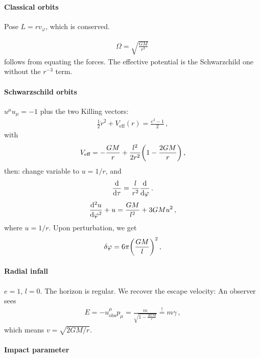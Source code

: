 \documentclass[main.tex]{subfiles}
\begin{document}
\paragraph{Classical orbits}

Pose \(L = r v_{\varphi }\), which is conserved. 

\begin{align}
\Omega = \sqrt{\frac{GM}{r^3}}
\,
\end{align}
%
follows from equating the forces.
The effective potential is the Schwarzchild one without the \(r^{-3}\) term.

\paragraph{Schwarzschild orbits}

\(u^{\mu } u_{\mu } = -1\) plus the two Killing vectors: 
%
\begin{align}
\frac{1}{2}\dot{r}^2 + V _{\text{eff}} (r) = \frac{e^2-1}{2}
\,,
\end{align}
%
with
%
\begin{align}
V _{\text{eff}} = - \frac{GM}{r} + \frac{l^2}{2 r^2} \qty(1 - \frac{2GM}{r})
\,,
\end{align}
%
then: change variable to \(u = 1/r\), and
%
\begin{align}
\dv{}{\tau } = \frac{l}{r^2} \dv{}{\varphi }
\,.
\end{align}
%
\begin{align}
\dv[2]{u}{\varphi } + u = \frac{GM}{l^2} + 3GMu^2
\,,
\end{align}
%
where \(u = 1/r\). Upon perturbation, we get 
%
\begin{align}
\delta \varphi = 6 \pi \qty(\frac{GM}{l})^2
\,,
\end{align}
%

\paragraph{Radial infall}

\(e = 1\), \(l =0 \). The horizon is regular. 
We recover the escape velocity: An observer sees 
%
\begin{align}
E = - u^{\mu } _{\text{obs}} p_{\mu } = \frac{m}{\sqrt{1 - \frac{2GM}{r}}} \overset{!}{=} m \gamma 
\,,
\end{align}
%
which means \(v = \sqrt{2GM/r}\).

\paragraph{Impact parameter}
\end{document}
